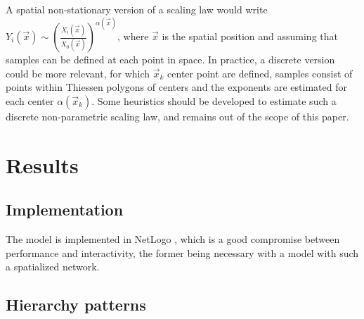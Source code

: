 \documentclass[english,fleqn,allpages]{ISTE_science}[2018/07/30]
\begin{document}
A spatial non-stationary version of a scaling law would write $Y_i (\vec{x}) \sim \left(\frac{X_i(\vec{x})}{X_0 (\vec{x})}\right)^{\alpha (\vec{x})}$, where $\vec{x}$ is the spatial position and assuming that samples can be defined at each point in space. In practice, a discrete version could be more relevant, for which $\vec{x}_k$ center point are defined, samples consist of points within Thiessen polygons of centers and the exponents are estimated for each center $\alpha (\vec{x}_k)$. Some heuristics should be developed to estimate such a discrete non-parametric scaling law, and remains out of the scope of this paper.



\section{Results}


\subsection{Implementation}

The model is implemented in NetLogo \cite{tisue2004netlogo}, which is a good compromise between performance and interactivity, the former being necessary with a model with such a spatialized network. 


\subsection{Hierarchy patterns}

\end{document}
